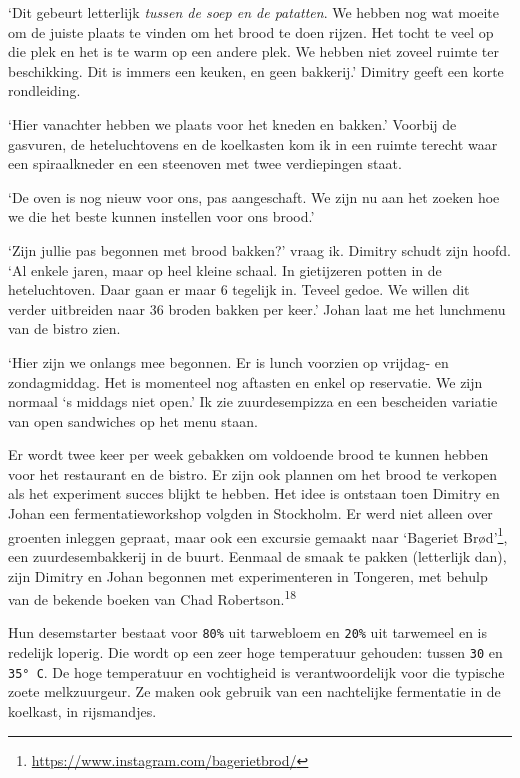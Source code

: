 \documentclass[
  11pt,
  dutch,
]{memoir}
\begin{document}
`Dit gebeurt letterlijk \emph{tussen de soep en de patatten}. We hebben
nog wat moeite om de juiste plaats te vinden om het brood te doen
rijzen. Het tocht te veel op die plek en het is te warm op een andere
plek. We hebben niet zoveel ruimte ter beschikking. Dit is immers een
keuken, en geen bakkerij.' Dimitry geeft een korte rondleiding.

`Hier vanachter hebben we plaats voor het kneden en bakken.' Voorbij de
gasvuren, de heteluchtovens en de koelkasten kom ik in een ruimte
terecht waar een spiraalkneder en een steenoven met twee verdiepingen
staat.

`De oven is nog nieuw voor ons, pas aangeschaft. We zijn nu aan het
zoeken hoe we die het beste kunnen instellen voor ons brood.'

`Zijn jullie pas begonnen met brood bakken?' vraag ik. Dimitry schudt
zijn hoofd. `Al enkele jaren, maar op heel kleine schaal. In gietijzeren
potten in de heteluchtoven. Daar gaan er maar 6 tegelijk in. Teveel
gedoe. We willen dit verder uitbreiden naar 36 broden bakken per keer.'
Johan laat me het lunchmenu van de bistro zien.

`Hier zijn we onlangs mee begonnen. Er is lunch voorzien op vrijdag- en
zondagmiddag. Het is momenteel nog aftasten en enkel op reservatie. We
zijn normaal `s middags niet open.' Ik zie zuurdesempizza en een
bescheiden variatie van open sandwiches op het menu staan.

Er wordt twee keer per week gebakken om voldoende brood te kunnen hebben
voor het restaurant en de bistro. Er zijn ook plannen om het brood te
verkopen als het experiment succes blijkt te hebben. Het idee is
ontstaan toen Dimitry en Johan een fermentatieworkshop volgden in
Stockholm. Er werd niet alleen over groenten inleggen gepraat, maar ook
een excursie gemaakt naar `Bageriet Brød'\footnote{\url{https://www.instagram.com/bagerietbrod/}},
een zuurdesembakkerij in de buurt. Eenmaal de smaak te pakken
(letterlijk dan), zijn Dimitry en Johan begonnen met experimenteren in
Tongeren, met behulp van de bekende boeken van Chad
Robertson.\textsuperscript{18}

Hun desemstarter bestaat voor \texttt{80\%} uit tarwebloem en
\texttt{20\%} uit tarwemeel en is redelijk loperig. Die wordt op een
zeer hoge temperatuur gehouden: tussen \texttt{30} en \texttt{35°\ C}.
De hoge temperatuur en vochtigheid is verantwoordelijk voor die typische
zoete melkzuurgeur. Ze maken ook gebruik van een nachtelijke fermentatie
in de koelkast, in rijsmandjes.
\end{document}
